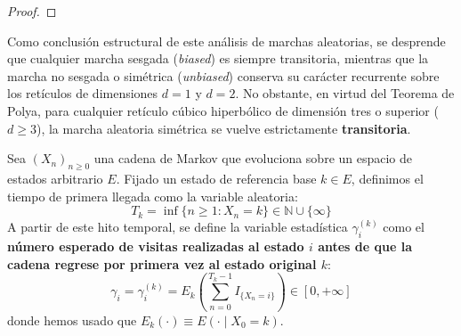 \begin{teo}
\begin{proof}
\end{proof}

\end{teo}

\begin{observacion}
    Como conclusión estructural de este análisis de marchas aleatorias, se desprende que cualquier marcha sesgada (\textit{biased}) es siempre transitoria, mientras que la marcha no sesgada o simétrica (\textit{unbiased}) conserva su carácter recurrente sobre los retículos de dimensiones $d=1$ y $d=2$. No obstante, en virtud del Teorema de Polya, para cualquier retículo cúbico hiperbólico de dimensión tres o superior ($d \geq 3$), la marcha aleatoria simétrica se vuelve estrictamente \textbf{transitoria}.
\end{observacion}


\begin{definicion}
    Sea $(X_n)_{n \geq 0}$ una cadena de Markov que evoluciona sobre un espacio de estados arbitrario $E$. Fijado un estado de referencia base $k \in E$, definimos el tiempo de primera llegada como la variable aleatoria:
    \[ 
    T_k = \inf\{n \geq 1 : X_n = k\} \in \mathbb{N} \cup \{\infty\} 
    \]
    A partir de este hito temporal, se define la variable estadística $\gamma_i^{(k)}$ como el \textbf{número esperado de visitas realizadas al estado $i$ antes de que la cadena regrese por primera vez al estado original $k$}:
    \[ 
    \gamma_i = \gamma_i^{(k)} = E_k \left( \sum_{n=0}^{T_k - 1} I_{\{X_n = i\}} \right) \in [0, +\infty] 
    \]
    donde hemos usado que $E_k(\cdot) \equiv E(\cdot \mid X_0 = k) $.
\end{definicion}



